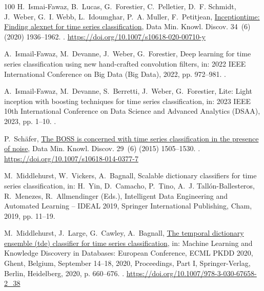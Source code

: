 \documentclass[final,3p,times,twocolumn]{elsarticle}
\begin{document}
\begin{thebibliography}{100}
H.~Ismai-Fawaz, B.~Lucas, G.~Forestier, C.~Pelletier, D.~F. Schmidt, J.~Weber,
  G.~I. Webb, L.~Idoumghar, P.~A. Muller, F.~Petitjean,
  \href{https://doi.org/10.1007/s10618-020-00710-y}{Inceptiontime: Finding
  alexnet for time series classification}, Data Min. Knowl. Discov. 34~(6)
  (2020) 1936–1962.
\newblock \href {https://doi.org/10.1007/s10618-020-00710-y}
  {}.
\newline\urlprefix\url{https://doi.org/10.1007/s10618-020-00710-y}

A.~Ismail-Fawaz, M.~Devanne, J.~Weber, G.~Forestier, Deep learning for time
  series classification using new hand-crafted convolution filters, in: 2022
  IEEE International Conference on Big Data (Big Data), 2022, pp. 972--981.
\newblock \href {https://doi.org/10.1109/BigData55660.2022.10020496}
  {}.

A.~Ismail-Fawaz, M.~Devanne, S.~Berretti, J.~Weber, G.~Forestier, Lite: Light
  inception with boosting techniques for time series classification, in: 2023
  IEEE 10th International Conference on Data Science and Advanced Analytics
  (DSAA), 2023, pp. 1--10.
\newblock \href {https://doi.org/10.1109/DSAA60987.2023.10302569}
  {}.

P.~Sch{\"{a}}fer, \href{https://doi.org/10.1007/s10618-014-0377-7}{The {BOSS}
  is concerned with time series classification in the presence of noise}, Data
  Min. Knowl. Discov. 29~(6) (2015) 1505--1530.
\newblock \href {https://doi.org/10.1007/S10618-014-0377-7}
  {}.
\newline\urlprefix\url{https://doi.org/10.1007/s10618-014-0377-7}

M.~Middlehurst, W.~Vickers, A.~Bagnall, Scalable dictionary classifiers for
  time series classification, in: H.~Yin, D.~Camacho, P.~Tino, A.~J.
  Tall{\'o}n-Ballesteros, R.~Menezes, R.~Allmendinger (Eds.), Intelligent Data
  Engineering and Automated Learning -- IDEAL 2019, Springer International
  Publishing, Cham, 2019, pp. 11--19.

M.~Middlehurst, J.~Large, G.~Cawley, A.~Bagnall,
  \href{https://doi.org/10.1007/978-3-030-67658-2_38}{The temporal dictionary
  ensemble (tde) classifier for time series classification}, in: Machine
  Learning and Knowledge Discovery in Databases: European Conference, ECML PKDD
  2020, Ghent, Belgium, September 14–18, 2020, Proceedings, Part I,
  Springer-Verlag, Berlin, Heidelberg, 2020, p. 660–676.
\newblock \href {https://doi.org/10.1007/978-3-030-67658-2_38}
  {}.
\newline\urlprefix\url{https://doi.org/10.1007/978-3-030-67658-2_38}


\end{thebibliography}
\end{document}
